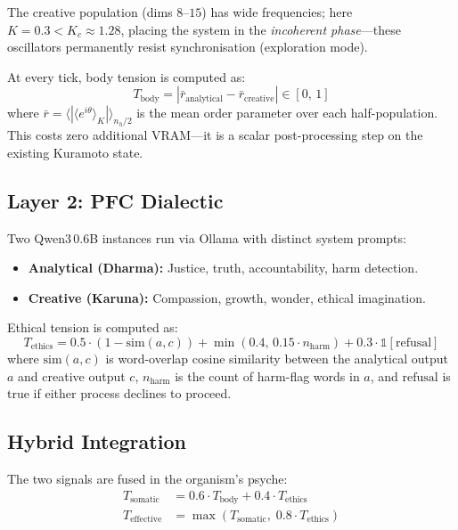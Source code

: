 \documentclass[11pt,a4paper,twocolumn]{article}
\begin{document}
The creative population (dims $8$--$15$) has wide frequencies; here $K = 0.3 < K_c \approx 1.28$,
placing the system in the \emph{incoherent phase}---these oscillators permanently resist
synchronisation (exploration mode).

At every tick, body tension is computed as:
\begin{equation}
T_{\text{body}} = \left| \bar{r}_{\text{analytical}} - \bar{r}_{\text{creative}} \right|
\in [0,\, 1]
\end{equation}
where $\bar{r} = \langle | \langle e^{i\theta} \rangle_K | \rangle_{n_h/2}$ is the mean order
parameter over each half-population. This costs zero additional VRAM---it is a scalar
post-processing step on the existing Kuramoto state.

\subsection{Layer 2: PFC Dialectic}

Two Qwen3\,0.6B instances run via Ollama with distinct system prompts:

\begin{itemize}
\item \textbf{Analytical (Dharma):} Justice, truth, accountability, harm detection.
\item \textbf{Creative (Karuna):} Compassion, growth, wonder, ethical imagination.
\end{itemize}

Ethical tension is computed as:
\begin{equation}
T_{\text{ethics}} = 0.5 \cdot (1 - \text{sim}(a,c)) + \min(0.4,\, 0.15 \cdot n_{\text{harm}}) + 0.3 \cdot \mathbb{1}[\text{refusal}]
\end{equation}
where $\text{sim}(a,c)$ is word-overlap cosine similarity between the analytical output $a$ and
creative output $c$, $n_{\text{harm}}$ is the count of harm-flag words in $a$, and $\text{refusal}$
is true if either process declines to proceed.

\subsection{Hybrid Integration}

The two signals are fused in the organism's psyche:
\begin{align}
T_{\text{somatic}} &= 0.6 \cdot T_{\text{body}} + 0.4 \cdot T_{\text{ethics}} \\
T_{\text{effective}} &= \max\!\left(T_{\text{somatic}},\; 0.8 \cdot T_{\text{ethics}}\right)
\end{align}
\end{document}
